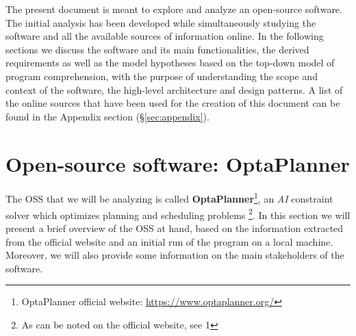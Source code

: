 \noindent The present document is meant to explore and analyze an open-source software. The initial analysis has been developed while simultaneously studying the software and all the available sources of information online. In the following sections we discuss the software and its main functionalities, the derived requirements as well as the model hypotheses based on the top-down model of program comprehension, with the purpose of understanding the scope and context of the software, the high-level architecture and design patterns.
A list of the online sources that have been used for the creation of this document can be found in the Appendix section (\S\ref{sec:appendix}). 
\section{Open-source software: OptaPlanner}
The OSS that we will be analyzing is called \textbf{OptaPlanner}\footnote{OptaPlanner official website: \url{https://www.optaplanner.org/}}, an \textit{AI} constraint solver which optimizes planning and scheduling problems \footnote{As can be noted on the official website, see 1}. In this section we will present a brief overview of the OSS at hand, based on the information extracted from the official website and an initial run of the program on a local machine. Moreover, we will also provide some information on the main stakeholders of the software.
